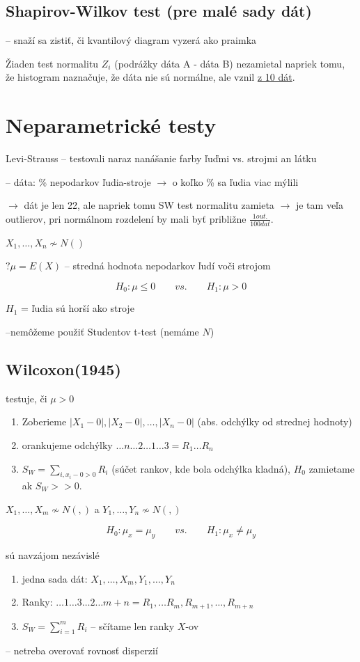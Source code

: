 \documentclass[unknownkeysallowed]{article}
\begin{document}
\subsection*{Shapirov-Wilkov test (pre malé sady dát)}
-- snaží sa zistiť, či kvantilový diagram vyzerá ako praimka

Žiaden test normalitu $Z_i$ (podrážky dáta A - dáta B) nezamietal napriek tomu, že histogram naznačuje, že dáta nie sú normálne, ale vznil \underline{z 10 dát}.

\section*{Neparametrické testy}
Levi-Strauss -- testovali naraz nanášanie farby ľuďmi vs. strojmi an látku

-- dáta:  \% nepodarkov ľudia-stroje $\to$ o koľko \% sa ľudia viac mýlili

$\to$ dát je len 22, ale napriek tomu SW test normalitu zamieta
\qquad $\to$ je tam veľa outlierov, pri normálnom rozdelení by mali byť približne $\frac{1 out.}{100 dat}$.

$X_1, \ldots, X_n \nsim N()$

$?\mu = E(X)$ -- stredná hodnota nepodarkov ľudí voči strojom

$$H_0: \mu \leq 0 \qquad vs. \qquad H_1: \mu > 0$$

$H_1$ = ľudia sú horší ako stroje

--nemôžeme použiť Studentov t-test (nemáme $N$)

\subsection*{Wilcoxon(1945)}
testuje, či $\mu > 0$
\begin{enumerate}
\item Zoberieme $|X_1 - 0|, |X_2 - 0|, \ldots, |X_n - 0|$ (abs. odchýlky od strednej hodnoty)
\item orankujeme odchýlky $\ldots n \ldots 2 \ldots 1 \ldots 3 = R_1 \ldots R_n$
\item $S_W = \sum_{i,x_i-0 > 0} R_i$ (súčet rankov, kde bola odchýlka kladná), $H_0$ zamietame ak $S_W >> 0$.
\end{enumerate}

$X_1, \ldots, X_m \nsim N(,)$ a $Y_1, \ldots, Y_n \nsim N(,)$

$$H_0: \mu_x = \mu_y \qquad vs. \qquad H_1: \mu_x \neq \mu_y$$

sú navzájom nezávislé
\begin{enumerate}
\item jedna sada dát: $X_1, \ldots, X_m, Y_1, \ldots, Y_n$
\item Ranky: $\ldots 1 \ldots 3 \ldots 2 \ldots m+n = R_1, \ldots R_m, R_{m+1}, \ldots, R_{m+n}$
\item $S_W = \sum_{i=1}^m R_i$ -- sčítame len ranky $X$-ov
\end{enumerate}
-- netreba overovať rovnosť disperzií
\end{document}
